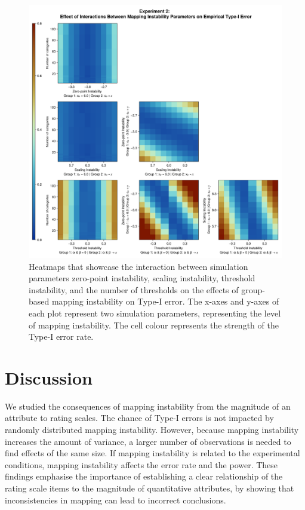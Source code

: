 \documentclass[titlepage, a4paper, 11pt]{article}
\begin{document}
\begin{figure}
    \centering
    \includegraphics[width=1\linewidth]{Plots/Interactions_measurement_instability_typeI_group_based.png}
    \caption{Heatmaps that showcase the interaction between simulation parameters zero-point instability, scaling instability, threshold instability, and the number of thresholds on the effects of group-based mapping instability on Type-I error. The x-axes and y-axes of each plot represent two simulation parameters, representing the level of mapping instability. The cell colour represents the strength of the Type-I error rate.}
    \label{fig:plot_six}
\end{figure}

\section{Discussion}
We studied the consequences of mapping instability from the magnitude of an attribute to rating scales. The chance of Type-I errors is not impacted by randomly distributed mapping instability. However, because mapping instability increases the amount of variance, a larger number of observations is needed to find effects of the same size. If mapping instability is related to the experimental conditions, mapping instability affects the error rate and the power. These findings emphasise the importance of establishing a clear relationship of the rating scale items to the magnitude of quantitative attributes, by showing that inconsistencies in mapping can lead to incorrect conclusions. 
\end{document}
